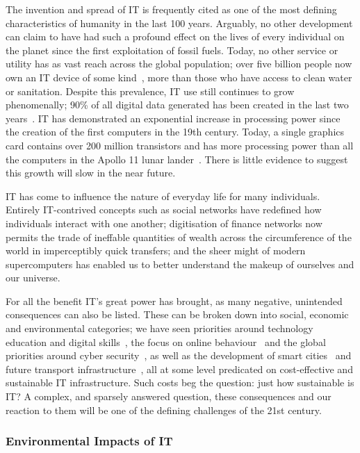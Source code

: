 \documentclass[conference]{IEEEtran}
\begin{document}
The invention and spread of IT is frequently cited as one of the most
defining characteristics of humanity in the last 100 years. Arguably,
no other development can claim to have had such a profound effect on
the lives of every individual on the planet since the first
exploitation of fossil fuels. Today, no other service or utility has
as vast reach across the global population; over five billion people
now own an IT device of some kind~\cite{arup-et-al:2011}, more than
those who have access to clean water or sanitation. Despite this
prevalence, IT use still continues to grow phenomenally; 90\% of all
digital data generated has been created in the last two
years~\cite{bbcnews:2012}. IT has demonstrated an exponential increase
in processing power since the creation of the first computers in the
19th century. Today, a single graphics card contains over 200 million
transistors and has more processing power than all the computers in
the Apollo 11 lunar lander~\cite{saran:2009}. There is little evidence
to suggest this growth will slow in the near future.

IT has come to influence the nature of everyday life for many
individuals. Entirely IT-contrived concepts such as social networks
have redefined how individuals interact with one another; digitisation
of finance networks now permits the trade of ineffable quantities of
wealth across the circumference of the world in imperceptibly quick
transfers; and the sheer might of modern supercomputers has enabled us
to better understand the makeup of ourselves and our universe.

For all the benefit IT’s great power has brought, as many negative,
unintended consequences can also be listed. These can be broken down
into social, economic and environmental categories; we have seen
priorities around technology education and digital
skills~\cite{brown-et-al-toce2014}, the focus on online
behaviour~\cite{oatley+crick:2014} and the global priorities around
cyber security~\cite{carr+crick-csss2015}, as well as the development
of smart cities~\cite{cosgrave-et-al:2014} and future transport
infrastructure~\cite{cooper-et-al-sose}, all at some level predicated
on cost-effective and sustainable IT infrastructure. Such costs beg
the question: just how sustainable is IT? A complex, and sparsely
answered question, these consequences and our reaction to them will be
one of the defining challenges of the 21st century.

\subsubsection{Environmental Impacts of IT}
\end{document}
